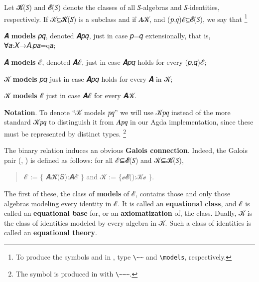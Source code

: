 \documentclass[a4paper,USenglish,cleveref,autoref,thm-restate]{lipics-v2019}
\begin{document}
Let \AB 𝓚(\AB 𝑆) and \AB 𝓔(\AB 𝑆) denote the classes of all \AB 𝑆-algebras and \AB 𝑆-identities, respectively. If \AB 𝒦\AS\ASy ⊆\AS\AB 𝓚(\AB 𝑆) is a subclass and if \AB 𝑨\AS\Ain \AS\AB 𝒦, and (\AB 𝑝\AS\ASy ,\AS\AB 𝑞)\AS\Ain \AS\AB ℰ\AS\ASy ⊆\AS\AB 𝓔(\AB 𝑆), we say that%
\footnote{To produce the symbols \Aapprox  and \Amodels  in \emacs \agdamode, type \texttt{\textbackslash{}\textasciitilde{}\textasciitilde{}} and \texttt{\textbackslash{}models}, respectively.}
\begin{romanenumerate}
\item \AB 𝑨 \textbf{models} \AB 𝑝\AS\ASy \Aapprox \AS\AB 𝑞, denoted \AB 𝑨\AS\ASy \Amodels \AS\AB 𝑝\AS\ASy \Aapprox \AS\AB 𝑞, just in case \termA 𝑝\AS\ASy =\AS\termA 𝑞 extensionally, that is, \ASy ∀\AS\AB 𝑎\AS\ASy :\AS\AB 𝑋\AS\ASy →\AS\AB 𝐴\AS\ASy ,\AS\termA 𝑝\AS\AB 𝑎\AS\ASy =\AS\termA q\AS\AB 𝑎;
\item \AB 𝑨 \textbf{models} \AB ℰ, denoted \AB 𝑨\AS\ASy \Amodels \AS\AB ℰ, just in case \AB 𝑨\AS\ASy \Amodels \AS\AB 𝑝\AS\ASy \Aapprox \AS\AB 𝑞 holds for every (\AB 𝑝\AS\ASy ,\AS\AB 𝑞)\AS\Ain \AS\AB ℰ;
\item \AB 𝒦 \textbf{models} \AB 𝑝\AS\ASy \Aapprox \AS\AB 𝑞 just in case \AB 𝑨\AS\ASy \Amodels \AS\AB 𝑝\AS\ASy \Aapprox \AS\AB 𝑞 holds for every \AB 𝑨 in \AB 𝒦;
\item \AB 𝒦 \textbf{models} \AB ℰ just in case \AB 𝑨\AS\ASy \Amodels \AS\AB ℰ for every \AB 𝑨\AS\Ain \AS\AB 𝒦.
\end{romanenumerate}

\noindent \textbf{Notation}.  To denote ``\AB 𝒦 models \AB 𝑝\AS\ASy \Aapprox \AS\AB 𝑞'' we will use \AB 𝒦\AS\ASy \Amodels \AS\AB 𝑝\AS \Aapproxxx \AS\AB 𝑞 instead of the more standard \AB 𝒦\AS\ASy \Amodels \AS\AB 𝑝\AS\ASy \Aapprox \AS\AB 𝑞 to distinguish it from \AB 𝑨\AS\ASy \Amodels \AS\AB 𝑝\AS\ASy \Aapprox \AS\AB 𝑞 in our Agda implementation, since these must be represented by distinct types.%
\footnote{The symbol \Aapproxxx is produced in \emacs \agdamode with \texttt{\textbackslash{}\textasciitilde{}\textasciitilde{}\textasciitilde{}}.}

The binary relation \AS \Amodels  induces an obvious \textbf{Galois connection}. Indeed, the Galois pair (, ) is defined as follows: for all \AB ℰ\AS\ASy ⊆\AS\AB 𝓔(\AB 𝑆) and \AB 𝒦\AS\ASy ⊆\AS\AB 𝓚(\AB 𝑆),
\begin{quote}
 \AB ℰ := \{ \AB 𝑨\AS\Ain \AS\AB 𝓚(\AB 𝑆)\AS\ASy :\AS\AB 𝑨\AS\ASy \Amodels \AS\AB ℰ \} and
 \AB 𝒦 := \{\AB ℯ\AS\Ain \AS\AB 𝓔()\AS\ASy :\AS\AB 𝒦\AS\ASy \Amodels \AS\AB ℯ \}.
\end{quote}
The first of these, the class of \textbf{models} of \AB ℰ, contains those and only those algebras modeling every identity in \AB ℰ. It is called an \textbf{equational class}, and \AB ℰ is called an \textbf{equational base} for, or an \textbf{axiomatization} of, the class. Dually,  \AB 𝒦 is the class of identities modeled by every algebra in \AB 𝒦. Such a class of identities is called an \textbf{equational theory}.
\end{document}
